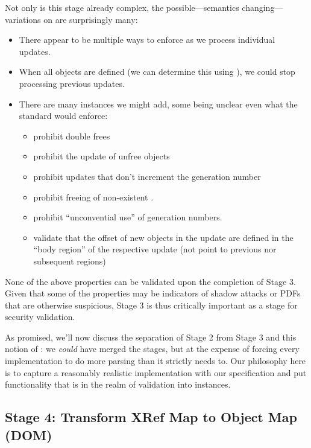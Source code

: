 Not only is this stage already complex, the
possible---semantics changing---variations on
 are surprisingly many:
\begin{itemize}
\item There appear to be multiple ways to enforce  as we
  process individual updates.
\item When all objects are defined (we can determine this using
  ), we could stop processing previous updates.
\item There are many  instances we might add,
  some being unclear even what the standard would enforce:
  \begin{itemize}
  \item prohibit double frees
  \item prohibit the update of unfree objects
  \item prohibit updates that don't increment the generation number
  \item prohibit freeing of non-existent \objids{}.
  \item prohibit ``unconvential use'' of generation numbers.
  \item validate that the offset of new objects in the update are
    defined in the ``body region'' of the respective update (not point
    to previous nor subsequent regions)
  \end{itemize}
\end{itemize}
%
None of the above properties can be validated upon the completion of Stage 3.
%
Given that some of the properties may be indicators of shadow attacks or PDFs that are otherwise suspicious, Stage 3 is thus critically important as a stage for security validation.

As promised, we'll now discuss the separation of Stage 2 from Stage 3
and this notion of : we \emph{could} have merged the
stages, but at the expense of forcing every implementation to do more
parsing than it strictly needs to.  Our philosophy here is to capture
a reasonably realistic implementation with our specification and put
functionality that is in the realm of validation into 
instances.


\subsection{Stage 4: Transform XRef Map to Object Map (DOM)}
\label{sec:stage-4}

